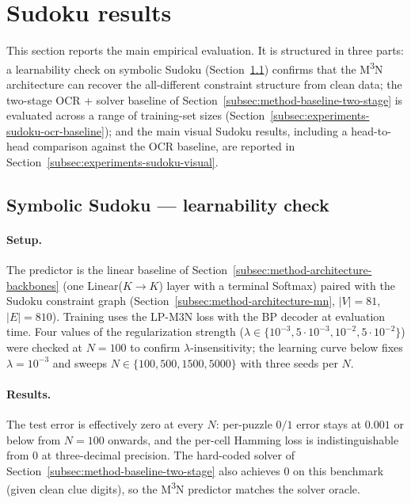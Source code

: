 \section{Sudoku results}
\label{sec:experiments-sudoku}

This section reports the main empirical evaluation. It is
structured in three parts: a learnability check on symbolic
Sudoku (Section~\ref{subsec:experiments-sudoku-symbolic})
confirms that the M\textsuperscript{3}N architecture can
recover the all-different constraint structure from clean
data; the two-stage OCR + solver baseline of
Section~\ref{subsec:method-baseline-two-stage} is evaluated
across a range of training-set sizes
(Section~\ref{subsec:experiments-sudoku-ocr-baseline}); and the
main visual Sudoku results, including a head-to-head
comparison against the OCR baseline, are reported in
Section~\ref{subsec:experiments-sudoku-visual}.

\subsection{Symbolic Sudoku --- learnability check}
\label{subsec:experiments-sudoku-symbolic}

\paragraph{Setup.}
The predictor is the linear baseline of
Section~\ref{subsec:method-architecture-backbones} (one
Linear($K \to K$) layer with a terminal Softmax) paired with
the Sudoku constraint graph
(Section~\ref{subsec:method-architecture-mn}, $|V| = 81$,
$|E| = 810$). Training uses the LP-M3N loss with the BP decoder
at evaluation time. Four values of the regularization strength
($\lambda \in \{10^{-3}, 5\cdot 10^{-3}, 10^{-2}, 5\cdot 10^{-2}\}$)
were checked at $N = 100$ to confirm $\lambda$-insensitivity;
the learning curve below fixes $\lambda = 10^{-3}$ and sweeps
$N \in \{100, 500, 1500, 5000\}$ with three seeds per $N$.

\paragraph{Results.}
The test error is effectively zero at every $N$: per-puzzle
$0/1$ error stays at $0.001$ or below from $N = 100$ onwards,
and the per-cell Hamming loss is indistinguishable from $0$ at
three-decimal precision. The hard-coded solver of
Section~\ref{subsec:method-baseline-two-stage} also achieves
$0$ on this benchmark (given clean clue digits), so the
M\textsuperscript{3}N predictor matches the solver oracle.

